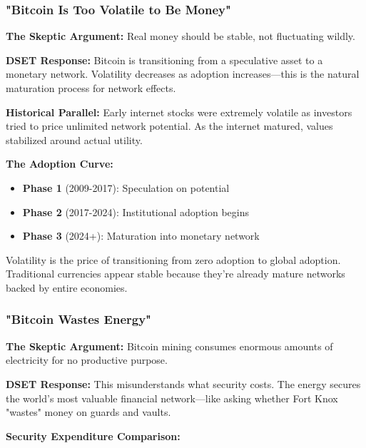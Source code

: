 \documentclass[11pt,oneside]{book}
\begin{document}
\subsubsection{"Bitcoin Is Too Volatile to Be Money"}

\textbf{The Skeptic Argument:} Real money should be stable, not fluctuating wildly.

\textbf{DSET Response:} Bitcoin is transitioning from a speculative asset to a monetary network. Volatility decreases as adoption increases—this is the natural maturation process for network effects.

\textbf{Historical Parallel:} Early internet stocks were extremely volatile as investors tried to price unlimited network potential. As the internet matured, values stabilized around actual utility.

\textbf{The Adoption Curve:}
\begin{itemize}
\item \textbf{Phase 1} (2009-2017): Speculation on potential
\item \textbf{Phase 2} (2017-2024): Institutional adoption begins
\item \textbf{Phase 3} (2024+): Maturation into monetary network
\end{itemize}

Volatility is the price of transitioning from zero adoption to global adoption. Traditional currencies appear stable because they're already mature networks backed by entire economies.

\subsubsection{"Bitcoin Wastes Energy"}

\textbf{The Skeptic Argument:} Bitcoin mining consumes enormous amounts of electricity for no productive purpose.

\textbf{DSET Response:} This misunderstands what security costs. The energy secures the world's most valuable financial network—like asking whether Fort Knox "wastes" money on guards and vaults.

\textbf{Security Expenditure Comparison:}
\end{document}
